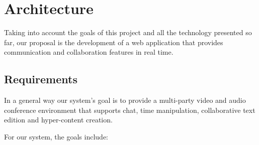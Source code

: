 \chapter{Architecture}
\label{chapter:architecture}


Taking into account the goals of this project and all the technology presented so far, our proposal is the development of a web application that provides communication and collaboration features in real time.

\section{Requirements}
In a general way our system's goal is to provide a multi-party video and audio conference environment that supports chat, time manipulation, collaborative text edition and hyper-content creation.


For our system, the goals include:

